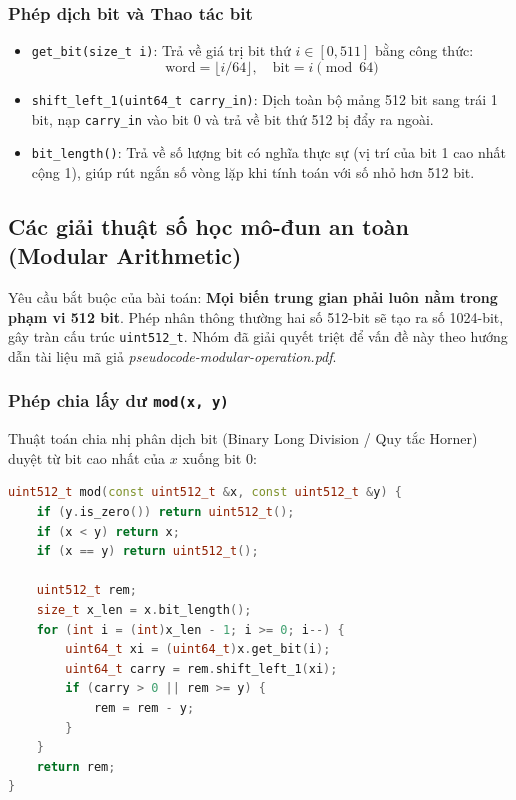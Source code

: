 \documentclass[12pt,a4paper]{article}
\theoremstyle{plain}
\begin{document}
\subsubsection{Phép dịch bit và Thao tác bit}
\begin{itemize}
    \item \texttt{get\_bit(size\_t i)}: Trả về giá trị bit thứ $i \in [0, 511]$ bằng công thức:
    \begin{equation}
    \text{word} = \lfloor i / 64 \rfloor, \quad \text{bit} = i \pmod{64}
    \end{equation}
    \item \texttt{shift\_left\_1(uint64\_t carry\_in)}: Dịch toàn bộ mảng 512 bit sang trái 1 bit, nạp \texttt{carry\_in} vào bit 0 và trả về bit thứ 512 bị đẩy ra ngoài.
    \item \texttt{bit\_length()}: Trả về số lượng bit có nghĩa thực sự (vị trí của bit 1 cao nhất cộng 1), giúp rút ngắn số vòng lặp khi tính toán với số nhỏ hơn 512 bit.
\end{itemize}

\subsection{Các giải thuật số học mô-đun an toàn (Modular Arithmetic)}
Yêu cầu bắt buộc của bài toán: \textbf{Mọi biến trung gian phải luôn nằm trong phạm vi 512 bit}. Phép nhân thông thường hai số 512-bit sẽ tạo ra số 1024-bit, gây tràn cấu trúc \texttt{uint512\_t}. Nhóm đã giải quyết triệt để vấn đề này theo hướng dẫn tài liệu mã giả \textit{pseudocode-modular-operation.pdf}.

\subsubsection{Phép chia lấy dư \texttt{mod(x, y)}}
Thuật toán chia nhị phân dịch bit (Binary Long Division / Quy tắc Horner) duyệt từ bit cao nhất của $x$ xuống bit 0:
\begin{lstlisting}[language=C++]
uint512_t mod(const uint512_t &x, const uint512_t &y) {
    if (y.is_zero()) return uint512_t();
    if (x < y) return x;
    if (x == y) return uint512_t();

    uint512_t rem;
    size_t x_len = x.bit_length();
    for (int i = (int)x_len - 1; i >= 0; i--) {
        uint64_t xi = (uint64_t)x.get_bit(i);
        uint64_t carry = rem.shift_left_1(xi);
        if (carry > 0 || rem >= y) {
            rem = rem - y;
        }
    }
    return rem;
}
\end{lstlisting}
\end{document}
